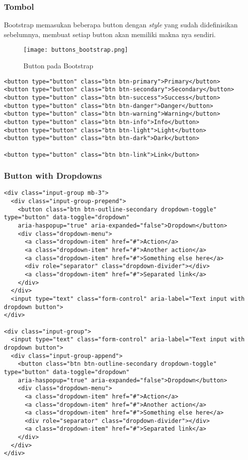 \subsubsection{Tombol}
Bootstrap memasukan beberapa button dengan \textit{style} yang sudah didefinisikan sebelumnya, membuat setiap button akan memiliki makna nya sendiri.
\begin{figure} [H]
	\centering  
	\texttt{[image: buttons\_bootstrap.png]}  
	\caption{Button pada Bootstrap} 
\end{figure}
\begin{lstlisting}[frame=single] 
<button type="button" class="btn btn-primary">Primary</button>
<button type="button" class="btn btn-secondary">Secondary</button>
<button type="button" class="btn btn-success">Success</button>
<button type="button" class="btn btn-danger">Danger</button>
<button type="button" class="btn btn-warning">Warning</button>
<button type="button" class="btn btn-info">Info</button>
<button type="button" class="btn btn-light">Light</button>
<button type="button" class="btn btn-dark">Dark</button>

<button type="button" class="btn btn-link">Link</button>
\end{lstlisting}
\subsubsection{Button with Dropdowns}
\begin{lstlisting}[frame=single, basicstyle=\tiny]
<div class="input-group mb-3">
  <div class="input-group-prepend">
    <button class="btn btn-outline-secondary dropdown-toggle" type="button" data-toggle="dropdown"
    aria-haspopup="true" aria-expanded="false">Dropdown</button>
    <div class="dropdown-menu">
      <a class="dropdown-item" href="#">Action</a>
      <a class="dropdown-item" href="#">Another action</a>
      <a class="dropdown-item" href="#">Something else here</a>
      <div role="separator" class="dropdown-divider"></div>
      <a class="dropdown-item" href="#">Separated link</a>
    </div>
  </div>
  <input type="text" class="form-control" aria-label="Text input with dropdown button">
</div>

<div class="input-group">
  <input type="text" class="form-control" aria-label="Text input with dropdown button">
  <div class="input-group-append">
    <button class="btn btn-outline-secondary dropdown-toggle" type="button" data-toggle="dropdown"
    aria-haspopup="true" aria-expanded="false">Dropdown</button>
    <div class="dropdown-menu">
      <a class="dropdown-item" href="#">Action</a>
      <a class="dropdown-item" href="#">Another action</a>
      <a class="dropdown-item" href="#">Something else here</a>
      <div role="separator" class="dropdown-divider"></div>
      <a class="dropdown-item" href="#">Separated link</a>
    </div>
  </div>
</div>
\end{lstlisting}

